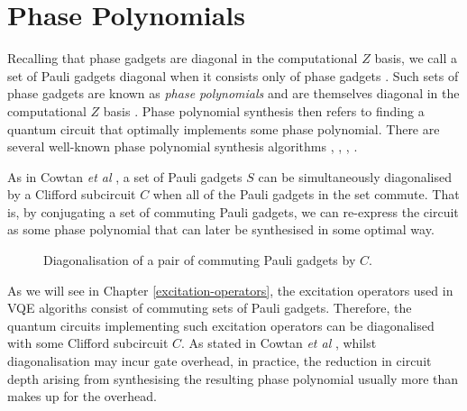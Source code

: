 \section{Phase Polynomials}%
\label{phase-polynomials}

Recalling that phase gadgets are diagonal in the computational $Z$ basis, we call a set of Pauli gadgets diagonal when it consists only of phase gadgets \cite{Cowtan2020}. Such sets of phase gadgets are known as \textit{phase polynomials} and are themselves diagonal in the computational $Z$ basis \cite{Cowtan2019}. Phase polynomial synthesis then refers to finding a quantum circuit that optimally implements some phase polynomial. There are several well-known phase polynomial synthesis algorithms \cite{Amy2013}, \cite{Amy2014}, \cite{Nam2018}, \cite{Maslov2018}.

As in Cowtan \textit{et al} \cite{Cowtan2020}, a set of Pauli gadgets $S$ can be simultaneously diagonalised by a Clifford subcircuit $C$ when all of the Pauli gadgets in the set commute. That is, by conjugating a set of commuting Pauli gadgets, we can re-express the circuit as some phase polynomial that can later be synthesised in some optimal way.

\begin{figure}[H]
    \centering
    \caption{Diagonalisation of a pair of commuting Pauli gadgets by $C$.}
\end{figure}

As we will see in Chapter \ref{excitation-operators}, the excitation operators used in VQE algoriths consist of commuting sets of Pauli gadgets. Therefore, the quantum circuits implementing such excitation operators can be diagonalised with some Clifford subcircuit $C$. As stated in Cowtan \textit{et al} \cite{Cowtan2020}, whilst diagonalisation may incur gate overhead, in practice, the reduction in circuit depth arising from synthesising the resulting phase polynomial usually more than makes up for the overhead.
